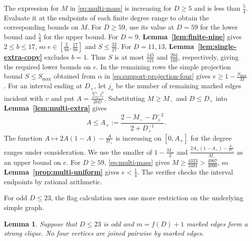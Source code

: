 \documentclass[preprint,11pt,numbers]{elsarticle-arxiv}
\numberwithin{equation}{section}
\newtheorem{lemma}[theorem]{Lemma}
\theoremstyle{definition}
\begin{document}
The expression for $M$ in \eqref{eq:multi-mass} is increasing for
$D\geq5$ and is less than $\frac{5}{4}$. Evaluate it at the endpoints
of each finite degree range to obtain the corresponding bounds on
$M$. For $D\geq59$, use its value at $D=59$ for the lower bound
and $\frac{5}{4}$ for the upper bound.
For $D=9$, \textbf{Lemma~\ref{lem:finite-nine}} gives $2\le b\le17$, so
$e\in[\frac{2}{98},\frac{17}{98}]$ and $S\le\frac{32}{27}$. For $D=11,13$,
\textbf{Lemma~\ref{lem:single-extra-copy}} excludes $b=1$. Thus $S$ is at most
$\frac{145}{121}$ and $\frac{204}{169}$, respectively, giving the required lower
bounds on $e$. In the remaining rows the simple projection bound
$S\le S_{\max}$ obtained from $\alpha$
in \eqref{eq:support-projection-four} gives $e\ge1-\frac{S_{\max}}{M}$. For an
interval ending at $D_+$, let $j_v$ be the number of remaining
marked edges incident with $v$ and put $A=\frac{\sum_v j_v^2}{2bD}$.
Substituting $M\geq M_-$ and $D\leq D_+$ into
\textbf{Lemma~\ref{lem:multi-extra}} gives
\[
 A\le A_+:=\frac{2-M_--D_+^{-2}}{2+D_+^{-1}}.
\]
The function $A\mapsto 2A(1-A)-\frac{A}{D_+}$ is increasing on
$[0,A_+]$ for the degree ranges under consideration. We use the
smaller of $1-\frac{M_-}{2}$ and
$\frac{2A_+(1-A_+)-\frac{A_+}{D_+}}{M_-}$ as an upper bound on $e$.
For $D\geq59$, \eqref{eq:multi-mass} gives
$M\geq\frac{4323}{3481}>\frac{4967}{4000}$, so
\textbf{Lemma~\ref{prop:multi-uniform}} gives $e<\frac{1}{4}$.
The verifier checks the interval endpoints by rational arithmetic.

For odd $D\leq23$, the flag calculation uses one more restriction
on the underlying simple graph.

\begin{lemma}\label{lem:finite-k4}
Suppose that $D\leq23$ is odd and $m=f(D)+1$ marked edges form a
strong clique. No four vertices are joined pairwise by marked edges.
\end{lemma}
\end{document}
